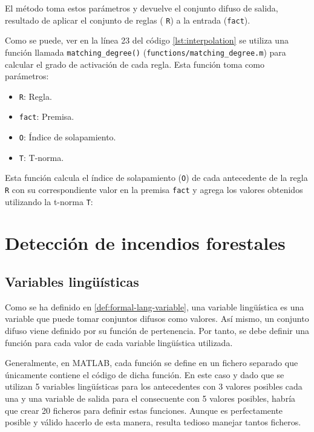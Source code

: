 El método toma estos parámetros y devuelve el conjunto difuso de salida, resultado de aplicar el conjunto de reglas ( \lstinline|R|) a la entrada (\lstinline|fact|).



Como se puede, ver en la línea 23 del código \ref{lst:interpolation} se utiliza una función llamada \lstinline|matching_degree()| (\lstinline|functions/matching_degree.m|) para calcular el grado de activación de cada regla. Esta función toma como parámetros:

\begin{itemize}
\item \lstinline|R|: Regla.
\item \lstinline|fact|: Premisa.
\item \lstinline|O|: Índice de solapamiento.
\item \lstinline|T|: T-norma.
\end{itemize}

Esta función calcula el índice de solapamiento (\lstinline|O|) de cada antecedente de la regla \lstinline|R| con su correspondiente valor en la premisa \lstinline|fact|  y agrega los valores obtenidos utilizando la t-norma \lstinline|T|:


 
\section{Detección de incendios forestales}
\subsection{Variables lingüísticas}
Como se ha definido en \ref{def:formal-lang-variable}, una variable lingüística es una variable que puede tomar conjuntos difusos como valores. Así mismo, un conjunto difuso viene definido por su función de pertenencia. Por tanto, se debe definir una función para cada valor de cada variable lingüística utilizada. 

Generalmente, en MATLAB, cada función se define en un fichero separado que únicamente contiene el código de dicha función. En este caso y dado que se utilizan 5 variables lingüísticas para los antecedentes con 3 valores posibles cada una y una variable de salida para el consecuente con 5 valores posibles, habría que crear 20 ficheros para definir estas funciones. Aunque es perfectamente posible y válido hacerlo de esta manera, resulta tedioso manejar tantos ficheros. 

